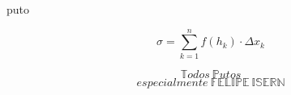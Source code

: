\documentclass[tiny]{corsage}
\begin{document}
	puto

	\[ \sigma = \sum_{k = 1}^n{f(h_k) \cdot \Delta x_k} \]

	\[ \mathbb{T}odos\ \mathbb{P}utos \] 
	\[especialmente\ \mathbb{FELIPE\ ISERN} \]
\end{document}
